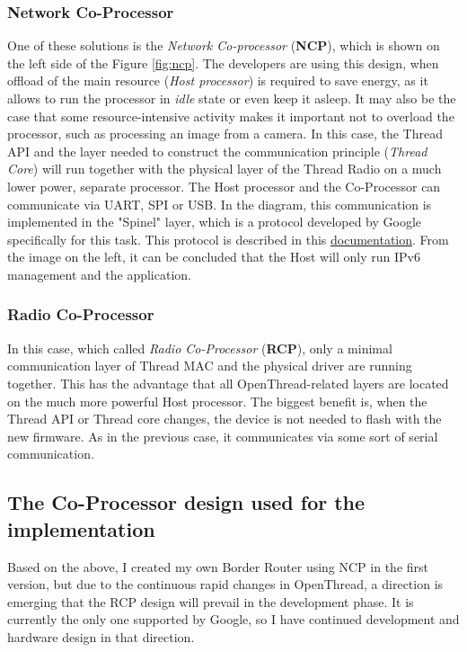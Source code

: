 \subsubsection{Network Co-Processor}
One of these solutions is the \textit{Network Co-processor} (\textbf{NCP}), which is shown on the left side of the Figure \ref{fig:ncp}. The developers are using this design, when offload of the main resource (\textit{Host processor}) is required to save energy, as it allows to run the processor in \textit{idle} state or even keep it asleep. It may also be the case that some resource-intensive activity makes it important not to overload the processor, such as processing an image from a camera. In this case, the Thread API and the layer needed to construct the communication principle (\textit{Thread Core}) will run together with the physical layer of the Thread Radio on a much lower power, separate processor. The Host processor and the Co-Processor can communicate via UART, SPI or USB. In the diagram, this communication is implemented in the "Spinel" layer, which is a protocol developed by Google specifically for this task. This protocol is described in this \href{https://datatracker.ietf.org/doc/html/draft-rquattle-spinel-unified}{documentation}\cite{SpinelDoc}. From the image on the left, it can be concluded that the Host will only run IPv6 management and the application.

\subsubsection{Radio Co-Processor}
In this case, which called \textit{Radio Co-Processor} (\textbf{RCP}), only a minimal communication layer of Thread MAC and the physical driver are running together. This has the advantage that all OpenThread-related layers are located on the much more powerful Host processor. The biggest benefit is, when the Thread API or Thread core changes, the device is not needed to flash with the new firmware. As in the previous case, it communicates via some sort of serial communication.

\subsection{The Co-Processor design used for the implementation}
Based on the above, I created my own Border Router using NCP in the first version, but due to the continuous rapid changes in OpenThread, a direction is emerging that the RCP design will prevail in the development phase. It is currently the only one supported by Google, so I have continued development and hardware design in that direction. 

